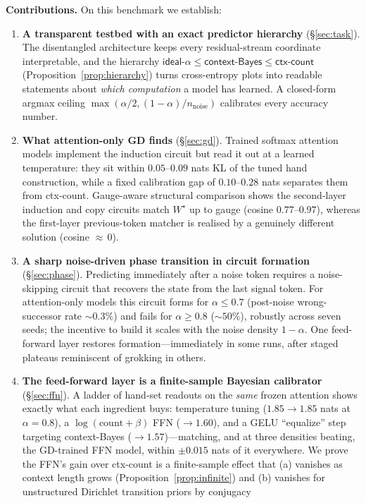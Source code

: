 \documentclass{article} %
\newcommand{\ctxcount}{\textsf{ctx-count}}
\newcommand{\ctxbayes}{\textsf{context-Bayes}}
\newcommand{\idealalpha}{\textsf{ideal-$\alpha$}}
\newcommand{\Wstar}{W^{\star}}
\newcommand{\nnoise}{n_{\mathrm{noise}}}
\begin{document}
\textbf{Contributions.} On this benchmark we establish:
\begin{enumerate}
\item \textbf{A transparent testbed with an exact predictor hierarchy}
(\S\ref{sec:task}). The disentangled architecture keeps every residual-stream
coordinate interpretable, and the hierarchy
$\idealalpha \le \ctxbayes \le \ctxcount$ (Proposition~\ref{prop:hierarchy}) turns
cross-entropy plots into readable statements about \emph{which computation} a model
has learned. A closed-form argmax ceiling $\max(\alpha/2,(1-\alpha)/\nnoise)$
calibrates every accuracy number.
\item \textbf{What attention-only GD finds} (\S\ref{sec:gd}). Trained softmax
attention models implement the induction circuit but read it out at a learned
temperature: they sit within $0.05$--$0.09$ nats KL of the tuned hand construction,
while a fixed calibration gap of $0.10$--$0.28$ nats separates them from \ctxcount{}.
Gauge-aware structural comparison shows the second-layer induction and copy circuits
match $\Wstar$ up to gauge (cosine $0.77$--$0.97$), whereas the first-layer
previous-token matcher is realised by a genuinely different solution (cosine
${\approx}\,0$).
\item \textbf{A sharp noise-driven phase transition in circuit formation}
(\S\ref{sec:phase}). Predicting immediately after a noise token requires a
noise-skipping circuit that recovers the state from the last signal token. For
attention-only models this circuit forms for $\alpha\le0.7$ (post-noise
wrong-successor rate ${\sim}0.3\%$) and fails for $\alpha\ge0.8$ (${\sim}50\%$),
robustly across seven seeds; the incentive to build it scales with the noise density
$1-\alpha$. One feed-forward layer restores formation---immediately in some runs,
after staged plateaus reminiscent of grokking in others.
\item \textbf{The feed-forward layer is a finite-sample Bayesian calibrator}
(\S\ref{sec:ffn}). A ladder of hand-set readouts on the \emph{same} frozen attention
shows exactly what each ingredient buys: temperature tuning ($1.85\to1.85$ nats at
$\alpha{=}0.8$), a $\log(\mathrm{count}+\beta)$ FFN ($\to1.60$), and a GELU
``equalize'' step targeting \ctxbayes{} ($\to1.57$)---matching, and at three
densities beating, the GD-trained FFN model, within $\pm0.015$ nats of it everywhere.
We prove the FFN's gain over \ctxcount{} is a finite-sample effect that (a) vanishes
as context length grows (Proposition~\ref{prop:infinite}) and (b) vanishes for
unstructured Dirichlet transition priors by conjugacy

\end{enumerate}
\end{document}
